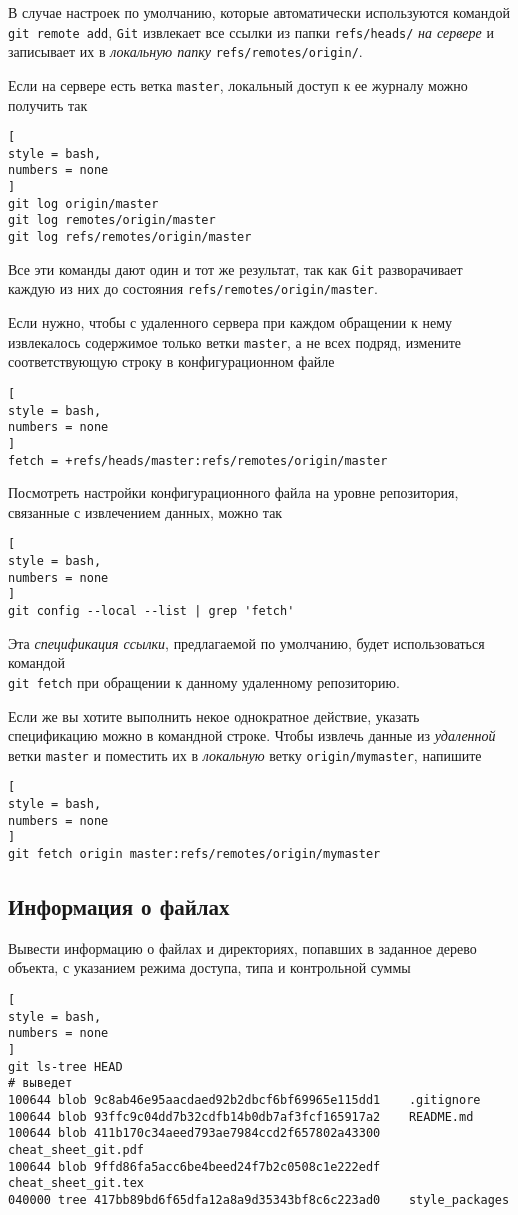 \documentclass[%
	11pt,
	a4paper,
	utf8,
		]{article}
\begin{document}
В случае настроек по умолчанию, которые автоматически используются командой \verb|git remote add|, \texttt{Git} извлекает все ссылки из папки \verb|refs/heads/| \emph{на сервере} и записывает их в \emph{локальную папку} \verb|refs/remotes/origin/|.

Если на сервере есть ветка \texttt{master}, локальный доступ к ее журналу можно получить так
\begin{lstlisting}[
style = bash,
numbers = none
]
git log origin/master
git log remotes/origin/master
git log refs/remotes/origin/master
\end{lstlisting}

Все эти команды дают один и тот же результат, так как \texttt{Git} разворачивает каждую из них до состояния \verb|refs/remotes/origin/master|.

Если нужно, чтобы с удаленного сервера при каждом обращении к нему извлекалось содержимое только ветки \texttt{master}, а не всех подряд, измените соответствующую строку в конфигурационном файле
\begin{lstlisting}[
style = bash,
numbers = none
]
fetch = +refs/heads/master:refs/remotes/origin/master
\end{lstlisting}

Посмотреть настройки конфигурационного файла на уровне репозитория, связанные с извлечением данных, можно так
\begin{lstlisting}[
style = bash,
numbers = none
]
git config --local --list | grep 'fetch'
\end{lstlisting}

{\color{blue} Эта \emph{спецификация ссылки}, предлагаемой по умолчанию, будет использоваться командой\\\texttt{git fetch} при обращении к данному удаленному репозиторию.}

Если же вы хотите выполнить некое однократное действие, указать спецификацию можно в командной строке. Чтобы извлечь данные из \emph{удаленной} ветки \texttt{master} и поместить их в \emph{локальную} ветку \verb|origin/mymaster|, напишите
\begin{lstlisting}[
style = bash,
numbers = none
]
git fetch origin master:refs/remotes/origin/mymaster
\end{lstlisting}

\subsection{Информация о файлах}

Вывести информацию о файлах и директориях, попавших в заданное дерево объекта, с указанием режима доступа, типа и контрольной суммы
\begin{lstlisting}[
style = bash,
numbers = none
]
git ls-tree HEAD
# выведет
100644 blob 9c8ab46e95aacdaed92b2dbcf6bf69965e115dd1    .gitignore
100644 blob 93ffc9c04dd7b32cdfb14b0db7af3fcf165917a2    README.md
100644 blob 411b170c34aeed793ae7984ccd2f657802a43300    cheat_sheet_git.pdf
100644 blob 9ffd86fa5acc6be4beed24f7b2c0508c1e222edf    cheat_sheet_git.tex
040000 tree 417bb89bd6f65dfa12a8a9d35343bf8c6c223ad0    style_packages
\end{lstlisting}
\end{document}
